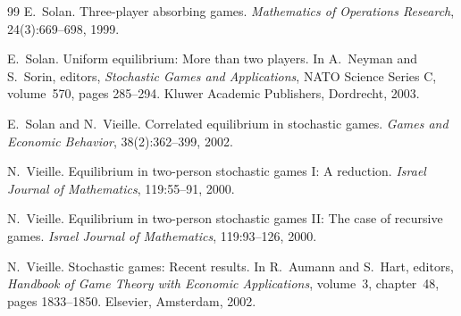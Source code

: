 \documentclass[12pt]{article}
\theoremstyle{definition}
\newcommand{\1}{\mathbf{1}}
\begin{document}
\begin{thebibliography}{99}
E.~Solan.
\newblock Three-player absorbing games.
\newblock \emph{Mathematics of Operations Research}, 24(3):669--698, 1999.

E.~Solan.
\newblock Uniform equilibrium: More than two players.
\newblock In A.~Neyman and S.~Sorin, editors, \emph{Stochastic Games and
Applications}, NATO Science Series C, volume~570, pages 285--294. Kluwer Academic
Publishers, Dordrecht, 2003.

E.~Solan and N.~Vieille.
\newblock Correlated equilibrium in stochastic games.
\newblock \emph{Games and Economic Behavior}, 38(2):362--399, 2002.

N.~Vieille.
\newblock Equilibrium in two-person stochastic games {I}: A reduction.
\newblock \emph{Israel Journal of Mathematics}, 119:55--91, 2000.

N.~Vieille.
\newblock Equilibrium in two-person stochastic games {II}: The case of recursive
games.
\newblock \emph{Israel Journal of Mathematics}, 119:93--126, 2000.

N.~Vieille.
\newblock Stochastic games: Recent results.
\newblock In R.~Aumann and S.~Hart, editors, \emph{Handbook of Game Theory with
Economic Applications}, volume~3, chapter~48, pages 1833--1850. Elsevier,
Amsterdam, 2002.

\end{thebibliography}
\end{document}
